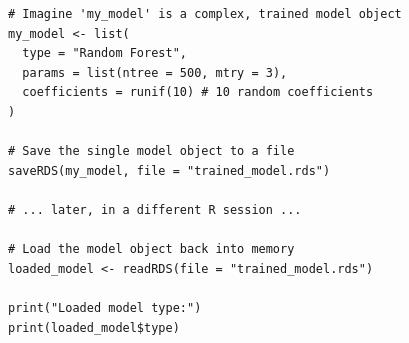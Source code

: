 \begin{example}
\text{ }\begin{verbatim}
# Imagine 'my_model' is a complex, trained model object
my_model <- list(
  type = "Random Forest",
  params = list(ntree = 500, mtry = 3),
  coefficients = runif(10) # 10 random coefficients
)

# Save the single model object to a file
saveRDS(my_model, file = "trained_model.rds")

# ... later, in a different R session ...

# Load the model object back into memory
loaded_model <- readRDS(file = "trained_model.rds")

print("Loaded model type:")
print(loaded_model$type)
\end{verbatim}
\end{example}
